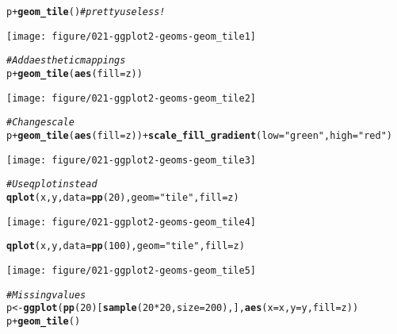 \documentclass[a4paper,titlepage]{tufte-handout}\usepackage[]{graphicx}\usepackage[]{color}
\makeatletter
\def\maxwidth{ %
  \ifdim\Gin@nat@width>\linewidth
    \linewidth
  \else
    \Gin@nat@width
  \fi
}
\newcommand{\hlnum}[1]{\textcolor[rgb]{0.686,0.059,0.569}{#1}}%
\newcommand{\hlstr}[1]{\textcolor[rgb]{0.192,0.494,0.8}{#1}}%
\newcommand{\hlcom}[1]{\textcolor[rgb]{0.678,0.584,0.686}{\textit{#1}}}%
\newcommand{\hlopt}[1]{\textcolor[rgb]{0,0,0}{#1}}%
\newcommand{\hlstd}[1]{\textcolor[rgb]{0.345,0.345,0.345}{#1}}%
\newcommand{\hlkwb}[1]{\textcolor[rgb]{0.69,0.353,0.396}{#1}}%
\newcommand{\hlkwc}[1]{\textcolor[rgb]{0.333,0.667,0.333}{#1}}%
\newcommand{\hlkwd}[1]{\textcolor[rgb]{0.737,0.353,0.396}{\textbf{#1}}}%
\newenvironment{kframe}{%
 \def\at@end@of@kframe{}%
 \ifinner\ifhmode%
  \def\at@end@of@kframe{\end{minipage}}%
  \begin{minipage}{\columnwidth}%
 \fi\fi%
 \def\FrameCommand##1{\hskip\@totalleftmargin \hskip-\fboxsep
 \colorbox{shadecolor}{##1}\hskip-\fboxsep
     \hskip-\linewidth \hskip-\@totalleftmargin \hskip\columnwidth}%
 \MakeFramed {\advance\hsize-\width
   \@totalleftmargin\z@ \linewidth\hsize
   \@setminipage}}%
 {\par\unskip\endMakeFramed%
 \at@end@of@kframe}
\newenvironment{knitrout}{}{} %
\makeatother
\begin{document}
\begin{knitrout}
\begin{kframe}
\begin{alltt}
\hlstd{p} \hlopt{+} \hlkwd{geom_tile}\hlstd{()} \hlcom{#pretty useless!}
\end{alltt}
\end{kframe}
\texttt{[image: figure/021-ggplot2-geoms-geom\_tile1]} 
\begin{kframe}\begin{alltt}
\hlcom{# Add aesthetic mappings}
\hlstd{p} \hlopt{+} \hlkwd{geom_tile}\hlstd{(}\hlkwd{aes}\hlstd{(}\hlkwc{fill}\hlstd{=z))}
\end{alltt}
\end{kframe}
\texttt{[image: figure/021-ggplot2-geoms-geom\_tile2]} 
\begin{kframe}\begin{alltt}
\hlcom{# Change scale}
\hlstd{p} \hlopt{+} \hlkwd{geom_tile}\hlstd{(}\hlkwd{aes}\hlstd{(}\hlkwc{fill}\hlstd{=z))} \hlopt{+} \hlkwd{scale_fill_gradient}\hlstd{(}\hlkwc{low}\hlstd{=}\hlstr{"green"}\hlstd{,} \hlkwc{high}\hlstd{=}\hlstr{"red"}\hlstd{)}
\end{alltt}
\end{kframe}
\texttt{[image: figure/021-ggplot2-geoms-geom\_tile3]} 
\begin{kframe}\begin{alltt}
\hlcom{# Use qplot instead}
\hlkwd{qplot}\hlstd{(x, y,} \hlkwc{data}\hlstd{=}\hlkwd{pp}\hlstd{(}\hlnum{20}\hlstd{),} \hlkwc{geom}\hlstd{=}\hlstr{"tile"}\hlstd{,} \hlkwc{fill}\hlstd{=z)}
\end{alltt}
\end{kframe}
\texttt{[image: figure/021-ggplot2-geoms-geom\_tile4]} 
\begin{kframe}\begin{alltt}
\hlkwd{qplot}\hlstd{(x, y,} \hlkwc{data}\hlstd{=}\hlkwd{pp}\hlstd{(}\hlnum{100}\hlstd{),} \hlkwc{geom}\hlstd{=}\hlstr{"tile"}\hlstd{,} \hlkwc{fill}\hlstd{=z)}
\end{alltt}
\end{kframe}
\texttt{[image: figure/021-ggplot2-geoms-geom\_tile5]} 
\begin{kframe}\begin{alltt}
\hlcom{# Missing values}
\hlstd{p} \hlkwb{<-} \hlkwd{ggplot}\hlstd{(}\hlkwd{pp}\hlstd{(}\hlnum{20}\hlstd{)[}\hlkwd{sample}\hlstd{(}\hlnum{20}\hlopt{*}\hlnum{20}\hlstd{,} \hlkwc{size}\hlstd{=}\hlnum{200}\hlstd{),],} \hlkwd{aes}\hlstd{(}\hlkwc{x}\hlstd{=x,}\hlkwc{y}\hlstd{=y,}\hlkwc{fill}\hlstd{=z))}
\hlstd{p} \hlopt{+} \hlkwd{geom_tile}\hlstd{()}
\end{alltt}

\end{kframe}
\end{knitrout}
\end{document}

